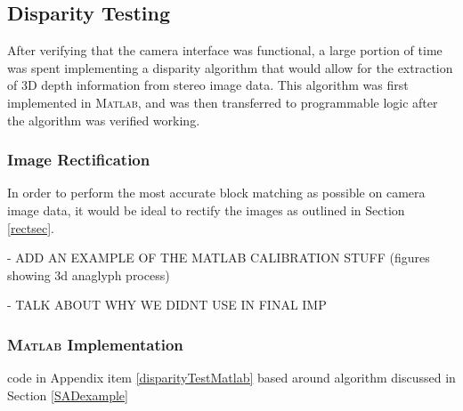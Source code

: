 \subsection{Disparity Testing}
After verifying that the camera interface was functional, a large portion of time was spent implementing a disparity algorithm that would allow for the extraction of 3D depth information from stereo image data. This algorithm was first implemented in \textsc{Matlab}, and was then transferred to programmable logic after the algorithm was verified working. 
\subsubsection{Image Rectification}
In order to perform the most accurate block matching as possible on camera image data, it would be ideal to rectify the images as outlined in Section \ref{rectsec}. 
\par
- ADD AN EXAMPLE OF THE MATLAB CALIBRATION STUFF (figures showing 3d anaglyph process)\par
- TALK ABOUT WHY WE DIDNT USE IN FINAL IMP


\subsubsection{\textsc{Matlab} Implementation}
\cite{mccormick}
code in Appendix item \ref{disparityTestMatlab}
based around algorithm discussed in Section \ref{SADexample}

